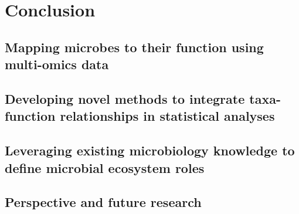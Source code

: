 \chapter{Conclusion}





\section{Mapping microbes to their function using multi-omics data}

\section{Developing novel methods to integrate taxa-function relationships in statistical analyses}

\section{Leveraging existing microbiology knowledge to define microbial ecosystem roles}

\section{Perspective and future research}